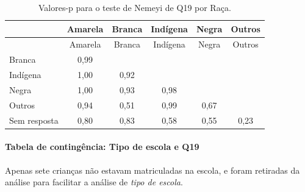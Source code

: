 \documentclass[]{article}
\let\oldparagraph\paragraph
\renewcommand{\paragraph}[1]{\oldparagraph{#1}\mbox{}}
\begin{document}
\begin{longtable}[]{@{}lccccc@{}}
\caption{\label{tab:unnamed-chunk-347}Valores-p para o teste de Nemeyi de Q19 por Raça.}\tabularnewline
\toprule
& Amarela & Branca & Indígena & Negra & Outros\tabularnewline
\midrule
\endfirsthead
\toprule
& Amarela & Branca & Indígena & Negra & Outros\tabularnewline
\midrule
\endhead
Branca & 0,99 & & & &\tabularnewline
Indígena & 1,00 & 0,92 & & &\tabularnewline
Negra & 1,00 & 0,93 & 0,98 & &\tabularnewline
Outros & 0,94 & 0,51 & 0,99 & 0,67 &\tabularnewline
Sem resposta & 0,80 & 0,83 & 0,58 & 0,55 & 0,23\tabularnewline
\bottomrule
\end{longtable}

\cleardoublepage

\hypertarget{tabela-de-continguxeancia-tipo-de-escola-e-q19}{%
\paragraph{Tabela de contingência: Tipo de escola e Q19}\label{tabela-de-continguxeancia-tipo-de-escola-e-q19}}

Apenas sete crianças não estavam matriculadas na escola, e foram retiradas da análise para facilitar a análise de \emph{tipo de escola}.
\end{document}
